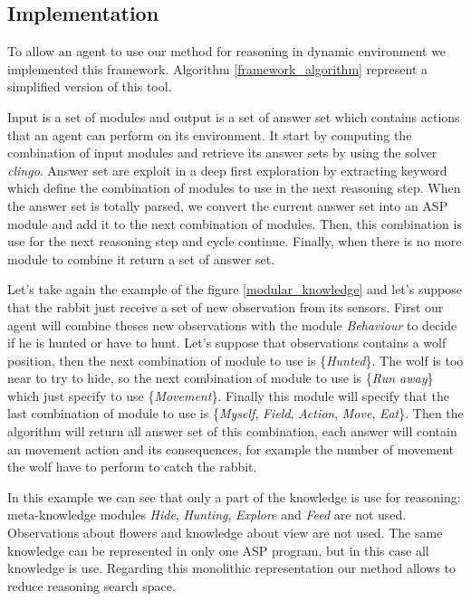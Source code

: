 \documentclass{aamas2012}
\begin{document}
\subsection{Implementation} %

	To allow an agent to use our method for reasoning in dynamic environment we implemented this framework.
	Algorithm \ref{framework_algorithm} represent a simplified version of this tool.
	
	Input is a set of modules and output is a set of answer set which contains actions that an agent can perform on its environment.
	It start by computing the combination of input modules and retrieve its answer sets by using the solver \emph{clingo}.
	Answer set are exploit in a deep first exploration by extracting keyword which define the combination of modules to use in the next reasoning step.
	When the answer set is totally parsed, we convert the current answer set into an ASP module and add it to the next combination of modules.
	Then, this combination is use for the next reasoning step and cycle continue.
	Finally, when there is no more module to combine it return a set of answer set.

	Let's take again the example of the figure \ref{modular_knowledge} and let's suppose that the rabbit just receive a set of new observation from its sensors.
	First our agent will combine theses new observations with the module \emph{Behaviour} to decide if he is hunted or have to hunt.
	Let's suppose that observations contains a wolf position, then the next combination of module to use is \{\emph{Hunted}\}.
	The wolf is too near to try to hide, so the next combination of module to use is \{\emph{Run away}\} which just specify to use \{\emph{Movement}\}.
	Finally this module will specify that the last combination of module to use is \{\emph{Myself}, \emph{Field}, \emph{Action}, \emph{Move}, \emph{Eat}\}.
	Then the algorithm will return all answer set of this combination, each answer will contain an movement action and its consequences, 
	for example the number of movement the wolf have to perform to catch the rabbit.
	
	In this example we can see that only a part of the knowledge is use for reasoning: 
	meta-knowledge modules \emph{Hide}, \emph{Hunting}, \emph{Explore} and \emph{Feed} are not used.
	Observations about flowers and knowledge about view are not used.
	The same knowledge can be represented in only one ASP program, but in this case all knowledge is use.
	Regarding this monolithic representation our method allows to reduce reasoning search space.
	
\end{document}
